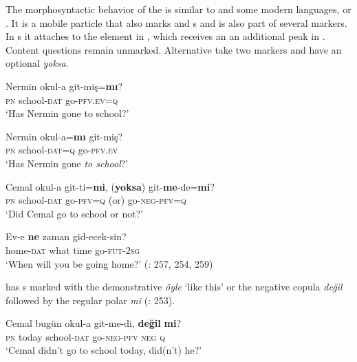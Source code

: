 The morphosyntactic behavior of the   is similar to  and some modern  languages,  or . It is a mobile particle that also marks  and s and is also part of several  markers. In s it attaches to the element in , which receives an an additional peak in  \citep[24]{Landmann2009}. Content questions remain unmarked. Alternative  take two markers and have an optional  \textit{yoksa}.

\ea%
    \label{ex:turk:2}
    \ea
    \gll Nermin  okul-a git-miş=\textbf{{mı}}?\\
    \textsc{pn}    school-\textsc{dat}    go-\textsc{pfv.ev=q}\\
    \glt ‘Has Nermin gone to school?’
    
    \ex
    \gll Nermin  okul-a=\textbf{{mı}} git-miş?\\
    \textsc{pn}    school-\textsc{dat=q}    go-\textsc{pfv.ev}\\
    \glt ‘Has Nermin gone \textit{to school}?’
    
    \ex
    \gll Cemal  okul-a    git-ti=\textbf{{mi}},  (\textbf{{yoksa}})    git-\textbf{{me}}-de=\textbf{{mi}}?\\
    \textsc{pn}  school-\textsc{dat}  go-\textsc{pfv=q}  (or)    go-\textsc{neg}-\textsc{pfv=q}\\
    \glt ‘Did Cemal go to school or not?’
    
    \ex
    \gll Ev-e \textbf{{ne}} zaman    gid-ecek-sin?\\
    home-\textsc{dat}  what  time    go-\textsc{fut}-2\textsc{sg}\\
    \glt ‘When will you be going home?’ (\citealt{GökselKerslake2005}: 257, 254, 259)\z\z

 has s marked with the demonstrative \textit{öyle} ‘like this’ or the negative copula \textit{değil} followed by the regular polar  \textit{mi} (\citealt{GökselKerslake2005}: 253).

\ea%
    \label{ex:turk:3}
    \ea
    \gll Cemal bugün okul-a git-me-di, \textbf{değil} \textbf{{mi}}?\\
    \textsc{pn}  today  school-\textsc{dat}  go-\textsc{neg}-\textsc{pfv}  \textsc{neg}  \textsc{q}\\
    \glt ‘Cemal didn’t go to school today, did(n’t) he?’
    
